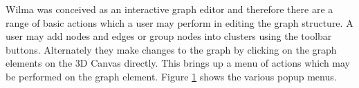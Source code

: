 \documentclass[runningheads]{cl2emult}
\begin{document}
Wilma was conceived as an interactive graph editor and therefore there
are a range of basic actions which a user may perform in editing the
graph structure.  A user may add nodes and edges or group nodes into
clusters using the toolbar buttons.  Alternately they make changes to
the graph by clicking on the graph elements on the 3D Canvas directly.
This brings up a menu of actions which may be performed on the graph
element.  Figure \ref{fig-popupmenus} shows the various popup menus.
\begin{figure}
  \label{fig-popupmenus}
  \subfigure[Edge] {
    \label{fig-multiscalecontrols}
\scalebox{0.3}{
}}
\end{figure}
\end{document}
